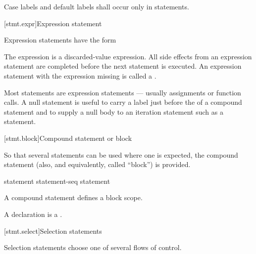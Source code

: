 \pnum
{}%
%
Case labels and default labels shall occur only in  statements.


[stmt.expr]{Expression statement}%

\pnum
Expression statements have the form

\begin{bnf}
\br
     \terminal{;}
\end{bnf}

The expression is
a discarded-value expression.
All
%
side effects from an expression statement
are completed before the next statement is executed.
%
%
An expression statement with the expression missing is called
a .
\begin{note}
Most statements are expression statements --- usually assignments or
function calls. A null statement is useful to carry a label just before
the \tcode{\}} of a compound statement and to supply a null body to an
iteration statement such as a 
statement.
\end{note}

[stmt.block]{Compound statement or block}%
%
%

\pnum
So that several statements can be used where one is expected, the
compound statement (also, and equivalently, called ``block'') is
provided.

\begin{bnf}
\br
    \terminal{\{}  \terminal{\}}
\end{bnf}

\begin{bnf}
\br
    statement\br
    statement-seq statement
\end{bnf}

A compound statement defines a block scope.
\begin{note}
A declaration is a .
\end{note}

[stmt.select]{Selection statements}%

\pnum
Selection statements choose one of several flows of control.


